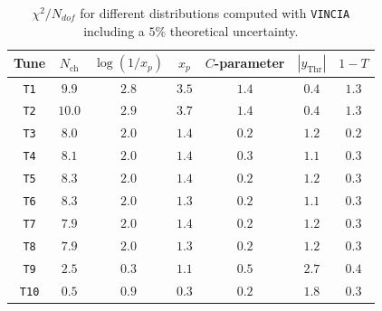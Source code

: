 \documentclass[aps,preprint,floatfix,nofootinbib,showpacs]{revtex4-1}
\begin{document}
\begin{table}[!t]
\begin{center}
 \begin{tabular}{ c | c | c | c | c | c | c}
 \hline \hline
  Tune       \hspace{1cm} & \hspace{0.3cm} $N_{\textrm{ch}}$ \hspace{0.3cm} 
  & \hspace{0.3cm} $\log(1/x_p)$ \hspace{0.3cm} & \hspace{0.3cm} $x_p$ \hspace{0.3cm} & \hspace{0.2cm} $C$-parameter \hspace{0.2cm} &
  \hspace{0.3cm} $|y_\textrm{Thr}|$ \hspace{0.3cm} & \hspace{0.3cm} $1-T$ \hspace{0.3cm} \\ \hline \hline
  \texttt{T1} & $9.9$ & $2.8$ & $3.5$  & $1.4$ & $0.4$ & $1.3$  \\ \hline \hline 
  \texttt{T2} & $10.0$ & $2.9$  & $3.7$ & $1.4$ & $0.4$ & $1.3$ \\ \hline \hline
  \texttt{T3} & $8.0$  & $2.0$  & $1.4$ & $0.2$ & $1.2$ & $0.2$ \\ \hline \hline
  \texttt{T4} & $8.1$  & $2.0$  & $1.4$ & $0.3$ & $1.1$ & $0.3$ \\ \hline \hline
  \texttt{T5} & $8.3$  & $2.0$  & $1.4$ & $0.2$ & $1.2$ & $0.3$ \\ \hline \hline
  \texttt{T6} & $8.3$  & $2.0$  & $1.3$ & $0.2$ & $1.1$ & $0.3$ \\ \hline \hline
  \texttt{T7} & $7.9$  & $2.0$  & $1.4$ & $0.2$ & $1.2$ & $0.3$ \\ \hline \hline
  \texttt{T8} & $7.9$  & $2.0$  & $1.3$ & $0.2$ & $1.2$ & $0.3$ \\ \hline \hline
  \texttt{T9} & $2.5$  & $0.3$  & $1.1$ & $0.5$ & $2.7$ & $0.4$ \\ \hline \hline
 \texttt{T10} & $0.5$  & $0.9$  & $0.3$ & $0.2$ & $1.8$ & $0.3$ \\ \hline \hline
 \end{tabular}
\end{center}
\caption{$\chi^2/N_{dof}$ for different distributions computed with \texttt{VINCIA}
including a $5\%$ theoretical uncertainty.}
\label{Vincia.chi2}
\end{table}
\end{document}

